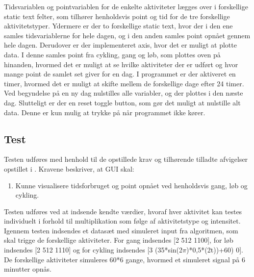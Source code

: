 Tidsvariablen og pointvariablen for de enkelte aktiviteter lægges over i forskellige static text felter, som tilhører henholdsvis point og tid for de tre forskellige aktivitetstyper. Ydermere er der to forskellige static text, hvor der i den ene samles tidsvariablerne for hele dagen, og i den anden samles point opnået gennem hele dagen. 
Derudover er der implementeret axis, hvor det er muligt at plotte data. I denne samles point fra cykling, gang og løb, som plottes oven på hinanden, hvormed det er muligt at se hvilke aktiviteter der er udført og hvor mange point de samlet set giver for en dag. 
I programmet er der aktiveret en timer, hvormed det er muligt at skifte mellem de forskellige dage efter 24 timer. Ved begyndelse på en ny dag nulstilles alle variabler, og der plottes i den næste dag. Slutteligt er der en reset toggle button, som gør det muligt at nulstille alt data. Denne er kun mulig at trykke på når programmet ikke kører. 

\subsection{Test}
Testen udføres med henhold til de opstillede krav og tilhørende tilladte afvigelser opstillet i . Kravene beskriver, at GUI skal:
\begin{enumerate}
	\item Kunne visualisere tidsforbruget og point opnået ved henholdsvis gang, løb og cykling. 
\end{enumerate}


Testen udføres ved at indsende kendte værdier, hvoraf hver aktivitet kan testes individuelt i forhold til multiplikation som følge af aktivitetstype og intensitet.
Igennem testen indsendes et datasæt med simuleret input fra algoritmen, som skal trigge de forskellige aktiviteter. For gang indsendes [2 512 1100], for løb indsendes [2 512 1110] og for cykling indsendes [3 (35*sin(2$\pi$)*0,5*(2t))+60) 0]. De forskellige aktiviteter simuleres 60*6 gange, hvormed et simuleret signal på 6 minutter opnås.

